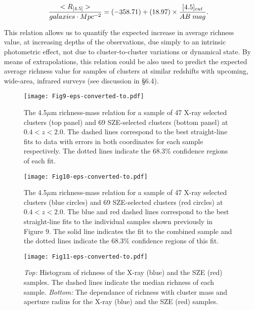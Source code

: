\documentclass[apj,twocolumn]{emulateapj}
\begin{document}
{\begin{equation}
\frac{<R_{[4.5]}>}{galaxies \cdot Mpc^{-2}} = (-358.71) +  (18.97) \times \frac{[4.5]_{cut}}{AB\hspace{0.1cm}mag}.
\label{richeness depth equation}
\end{equation}

This relation allows us to quantify the expected increase in average richness value, at increasing depths of the observations, due simply to an intrinsic photometric effect, not  due to cluster-to-cluster variations or dynamical state. By means of extrapolations, this relation could be also used to predict the expected average richness value for samples of clusters at similar redshifts with upcoming,  wide-area, infrared surveys (see discussion in \S 6.4).

\begin{figure}[t!]
\texttt{[image: Fig9-eps-converted-to.pdf]}
\caption{The 4.5$\mu$m richness-mass relation for a sample of 47 X-ray selected clusters (top panel) and 69 SZE-selected clusters (bottom panel) at $0.4<z<2.0$. The dashed lines correspond to the best straight-line fits to data with errors in both coordinates for each sample respectively.  The dotted lines indicate the 68.3$\%$ confidence regions of each fit.}
\label{MassRichnessXvsSZ}
\end{figure}

\begin{figure}[h!]
\texttt{[image: Fig10-eps-converted-to.pdf]}
\caption{The 4.5$\mu$m richness-mass relation for a sample of 47 X-ray selected clusters (blue circles) and 69 SZE-selected clusters (red circles) at $0.4<z<2.0$. The blue and red dashed lines correspond to the best straight-line fits to the individual samples shown previously in Figure 9. The solid line indicates the fit to the combined sample and the dotted lines indicate the 68.3$\%$ confidence regions of this fit.}
\label{MassRichness}
\end{figure}

\begin{figure}[h!]
\texttt{[image: Fig11-eps-converted-to.pdf]}
\caption{{\it Top:} Histogram of richness of the X-ray (blue) and the SZE (red) samples. The dashed lines indicate the median richness of each sample. {\it Bottom:} The dependance of richness with cluster mass and  aperture radius  for the  X-ray (blue) and the SZE (red) samples.}
\label{Profile}
\end{figure}

}
\end{document}
